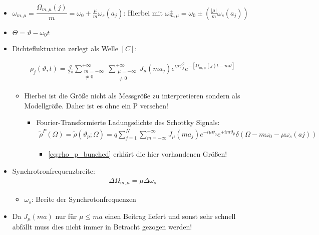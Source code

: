 \documentclass[12pt]{article}%
\renewcommand{\theta}{\vartheta}
\begin{document}
\begin{itemize}
	\item $\omega_{m,\mu} = \dfrac{\Omega_{m,\mu}(j)}{m} = \omega_0 + \frac{\mu}{m} \omega_s(a_j)$:
	Hierbei mit $\omega_{m,\mu}^{\pm}= \omega_0 \pm (\frac{|\mu|}{m}\omega_s(a_j))$  
	
	\item $\Theta = \theta - \omega_0 t$
	
\end{itemize}


\begin{itemize}
	\item Dichtefluktuation zerlegt als Welle $[C]$:
	
		\begin{align}
		\rho_j(\theta,t) = \frac{q}{2\pi} \sum_{\substack{m = -\infty \\ \neq 0}}^{+\infty} \sum_{\substack{\mu = -\infty\\ \neq 0}}^{+\infty} J_{\mu}(ma_j)e^{i\mu \psi_j^0}e^{-[\Omega_{m,\mu}(j)t-m\theta]}
		\end{align}
		\begin{itemize}
			
	\item  Hierbei ist die Größe nicht als Messgröße zu interpretieren sondern als Modellgröße. Daher ist es ohne ein P versehen!
	
	
	 \begin{itemize}
	 	\item Fourier-Transformierte Ladungsdichte des Schottky Signals: 
	 	\begin{align}
	 	\label{eq: ft_rho_bunched}
	 	\tilde{\rho}^P(\Omega) =\tilde{\rho}(\theta_p;\Omega) = q \sum_{j=1}^{N}\sum_{m = - \infty}^{+\infty} J_\mu(ma_j)e^{-i\mu\psi_0}e^{+im\theta_p}\delta(\Omega-m\omega_0-\mu\omega_s(aj))
	 	\end{align}
	 	\begin{itemize}
	 		\item \eqref{eq:rho_p_bunched} erklärt die hier vorhandenen Größen!  
	 	\end{itemize}
	 \end{itemize}
	
	\end{itemize} 
\end{itemize}


\begin{itemize}

	
	\item Synchrotronfrequenzbreite: 
	\begin{align}
		\Delta \Omega_{m,\mu}=\mu\Delta\omega_s
	\end{align}

	\begin{itemize}
		\item $\omega_s$: Breite der Synchrotonfrequenzen
	\end{itemize}
	
	\item Da $J_{\mu}(ma)$ nur für $\mu \leq ma $ einen Beitrag liefert und sonst sehr schnell abfällt muss dies nicht immer in Betracht gezogen werden! 
\end{itemize}
\end{document}
